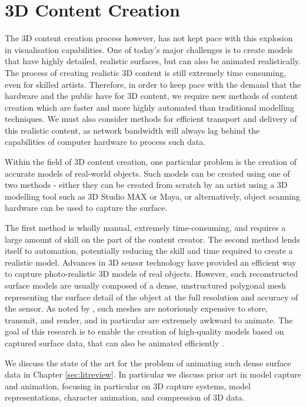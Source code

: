 \section{\label{sec:introduction:contentcreation}3D Content Creation}

The 3D content creation process however, has not kept pace with this explosion in visualisation capabilities. One of today's major challenges is to create models that have highly detailed, realistic surfaces, but can also be animated realistically. The process of creating realistic 3D content is still extremely time consuming, even for skilled artists. Therefore, in order to keep pace with the demand that the hardware and the public have for 3D content, we require new methods of content creation which are faster and more highly automated than traditional modelling techniques. We must also consider methods for efficient transport and delivery of this realistic content, as network bandwidth will always lag behind the capabilities of computer hardware to process such data.

Within the field of 3D content creation, one particular problem is the creation of accurate models of real-world objects. Such models can be created using one of two methods - either they can be created from scratch by an artist using a 3D modelling tool such as 3D Studio MAX or Maya, or alternatively, object scanning hardware can be used to capture the surface. 

The first method is wholly manual, extremely time-consuming, and requires a large amount of skill on the part of the content creator. The second method lends itself to automation, potentially reducing the skill and time required to create a realistic model. Advances in 3D sensor technology have provided an efficient way to capture photo-realistic 3D models of real objects. However, such reconstructed surface models are usually composed of a dense, unstructured polygonal mesh representing the surface detail of the object at the full resolution and accuracy of the sensor. As noted by \citet{Thalmann96}, such meshes are notoriously expensive to store, transmit, and render, and in particular are extremely awkward to animate. The goal of this research is to enable the creation of high-quality models based on captured surface data, that can also be animated efficiently \cite{Sun99}.

We discuss the state of the art for the problem of animating such dense surface data in Chapter \ref{sec:litreview}. In particular we discuss prior art in model capture and animation, focusing in particular on 3D capture systems, model representations, character animation, and compression of 3D data.

